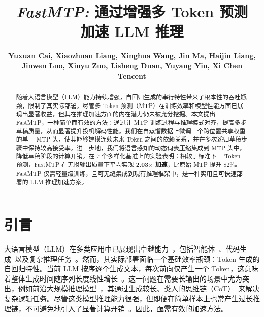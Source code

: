 \documentclass{article} %
\title{\textit{FastMTP:} 通过增强多 Token 预测\\加速 LLM 推理}
\author{
  \bf Yuxuan Cai, Xiaozhuan Liang, Xinghua Wang, Jin Ma, Haijin Liang, Jinwen Luo, Xinyu Zuo, Lisheng Duan, Yuyang Yin, Xi Chen\\
  \vspace{0.5em}
  Tencent
}
\begin{document}
\maketitle

\begin{abstract}
随着大语言模型（LLM）能力持续增强，自回归生成的串行特性带来了根本性的吞吐瓶颈，限制了其实际部署。尽管多 Token 预测（MTP）在训练效率和模型性能方面已展现出显著收益，但其在推理加速方面的内在潜力仍未被充分挖掘。本文提出 FastMTP，一种简单而有效的方法：通过让 MTP 训练过程与推理模式对齐，提高多步草稿质量，从而显著提升投机解码性能。我们在自蒸馏数据上微调一个跨位置共享权重的单一 MTP 头，使其能够建模连续未来 Token 之间的依赖关系，并在多次递归草稿步骤中保持较高接受率。进一步地，我们将语言感知的动态词表压缩集成到 MTP 头中，降低草稿阶段的计算开销。在 7 个多样化基准上的实验表明：相较于标准下一 Token 预测，FastMTP 在无损输出质量下平均实现 \textbf{2.03$\times$ 加速}，比原始 MTP 提升 82\%。FastMTP 仅需轻量级训练，且可无缝集成到现有推理框架中，是一种实用且可快速部署的 LLM 推理加速方案。
\end{abstract}


\vspace{-15pt}


\section{引言}

大语言模型（LLM）在多类应用中已展现出卓越能力~\citep{deepseek-ai2025deepseekr1,yang2025qwen3,glm-4.5team2025glm45,kimiteam2025kimi}，包括智能体~\citep{wangSurveyLargeLanguage2024,guoLargeLanguageModel2024}、代码生成~\citep{liuLargeLanguageModelBased2024,jiangSurveyLargeLanguage2024}以及复杂推理任务~\citep{chenReasoningEraSurvey2025, ahnLargeLanguageModels2024}。然而，其实际部署面临一个基础效率瓶颈：Token 生成的自回归特性。当前 LLM 按序逐个生成文本，每次前向仅产生一个 Token，这意味着整体生成时间随序列长度线性增长~\citep{santilli2023accelerating}。这一问题在需要长输出的场景中尤为突出，例如前沿大规模推理模型~\citep{openai2024openai,deepseek-ai2025deepseekr1}，其通过生成较长、类人的思维链（CoT）~\citep{wei2022chainofthought,sprague2025cot}来解决复杂逻辑任务。尽管这类模型推理能力很强，但即便在简单样本上也常产生过长推理链，不可避免地引入了显著计算开销~\citep{feng2025efficient}。因此，亟需有效的加速方法。

\end{document}
